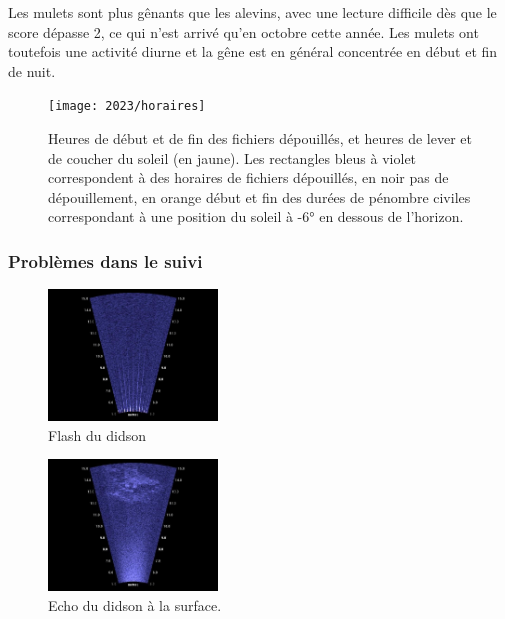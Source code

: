 \documentclass[11pt,twocolumn,titlepage,twoside]{article}
\begin{document}
Les mulets sont plus gênants que les alevins, avec une
lecture difficile dès que le score dépasse 2, ce qui n'est arrivé qu'en octobre
cette année. Les mulets ont toutefois une activité diurne et la gêne est
en général concentrée en début et fin de nuit.



\begin{figure}[htbp]
  \centering
  \texttt{[image: 2023/horaires]}
  \caption[Horaires de suivi]{Heures de début et de fin des fichiers
  dépouillés, et heures de lever et de coucher du soleil (en jaune). Les rectangles bleus
  à violet correspondent à des horaires de fichiers dépouillés, en noir pas de
  dépouillement, en orange début et fin des durées de pénombre civiles
  correspondant à une position du soleil à -6° en dessous de l'horizon.}
  \label{h_fonct}
\end{figure}

\subsubsection{Problèmes dans le suivi}
\label{parqualite}
\begin{figure}[htbp]
  \centering
  \includegraphics[width=0.4\textwidth]{flash}
  \caption[Interférence du didson]{Flash du didson}
  \label{flash}
\end{figure}
\begin{figure}[htbp]
  \centering
  \includegraphics[width=0.4\textwidth]{echo_surface}
  \caption[Echo à la surface]{Echo du didson à la surface.}
  \label{echo}
\end{figure}
\end{document}
